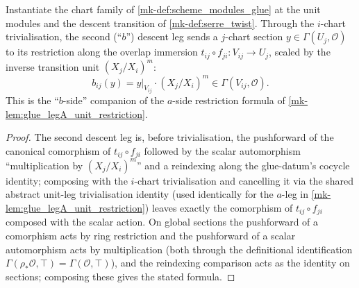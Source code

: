 \begin{lemma}\label{mk-lem:serre_twist_b_leg}
  \leanok

  Instantiate the chart family of \ref{mk-def:scheme_modules_glue} at the unit
  modules and the descent transition of \ref{mk-def:serre_twist}. Through the
  \(i\)-chart trivialisation, the second (``\(b\)'') descent leg sends a
  \(j\)-chart section \(y \in \Gamma(U_j, \mathcal O)\) to its restriction
  along the overlap immersion \(t_{ij} \circ f_{ji} : V_{ij} \to U_j\), scaled
  by the inverse transition unit \((X_j/X_i)^m\):
  \[
    b_{ij}(y) = y|_{V_{ij}} \cdot (X_j/X_i)^m \in \Gamma(V_{ij}, \mathcal O).
  \]
  This is the ``\(b\)-side'' companion of the \(a\)-side restriction formula
  of \ref{mk-lem:glue_legA_unit_restriction}.
\end{lemma}
\begin{proof}
  \leanok{}
  The second descent leg is, before trivialisation, the pushforward of the
  canonical comorphism of \(t_{ij} \circ f_{ji}\) followed by the scalar
  automorphism ``multiplication by \((X_j/X_i)^m\)'' and a reindexing along
  the glue-datum's cocycle identity; composing with the \(i\)-chart
  trivialisation and cancelling it via the shared abstract unit-leg
  trivialisation identity (used identically for the \(a\)-leg in
  \ref{mk-lem:glue_legA_unit_restriction}) leaves exactly the comorphism of
  \(t_{ij} \circ f_{ji}\) composed with the scalar action. On global
  sections the pushforward of a comorphism acts by ring restriction and the
  pushforward of a scalar automorphism acts by multiplication (both
  through the definitional identification \(\Gamma(\rho_* \mathcal O, \top) =
  \Gamma(\mathcal O, \top)\)), and the reindexing comparison acts as the
  identity on sections; composing these gives the stated formula.
\end{proof}

